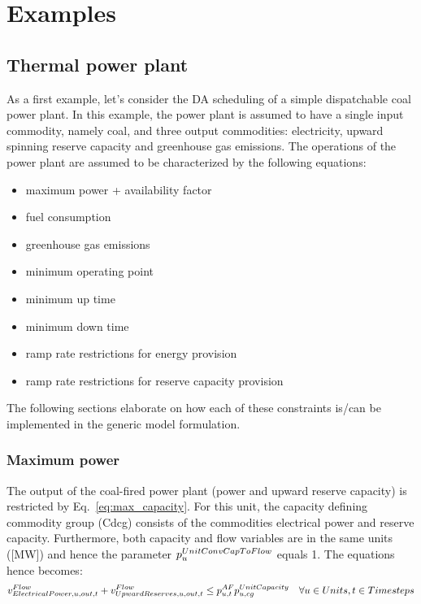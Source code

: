 

\clearpage
\section{Examples}

\subsection{Thermal power plant}
As a first example, let's consider the DA scheduling of a simple dispatchable coal power plant. In this example, the power plant is assumed to have a single input commodity, namely coal, and three output commodities: electricity, upward spinning reserve capacity and greenhouse gas emissions. The operations of the power plant are assumed to be characterized by the following equations:
\begin{itemize}
\item maximum power + availability factor 
\item fuel consumption
\item greenhouse gas emissions
\item minimum operating point
\item minimum up time
\item minimum down time
\item ramp rate restrictions for energy provision
\item ramp rate restrictions for reserve capacity provision
\end{itemize}

The following sections elaborate on how each of these constraints is/can be implemented in the generic model formulation.

\subsubsection{Maximum power}
The output of the coal-fired power plant (power and upward reserve capacity) is restricted by Eq.~\eqref{eq:max_capacity}. For this unit, the capacity defining commodity group (Cdcg) consists of the commodities electrical power and reserve capacity. Furthermore, both capacity and flow variables are in the same units ([MW]) and hence the parameter $\pUnitConvCapToFlow$ equals 1. The equations hence becomes:
\begin{align}
\vFlow[ElectricalPower,u,out,t] + \vFlow[UpwardReserves,u,out,t] \le \pAF \pUnitCapacity \quad \forall \units, \timesteps \nonumber
\end{align}

